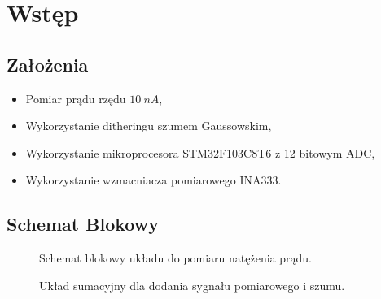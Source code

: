 \section{Wstęp}
    \subsection{Założenia}
        \begin{itemize}
            \item Pomiar prądu rzędu $10\ nA$,
            \item Wykorzystanie ditheringu szumem Gaussowskim, 
            \item Wykorzystanie mikroprocesora STM32F103C8T6 z 12 bitowym ADC,
            \item Wykorzystanie wzmacniacza pomiarowego INA333.
        \end{itemize}
    \subsection{Schemat Blokowy}
    \begin{figure}[!ht]
        \centering
        \scalebox{1}{}
        \caption{Schemat blokowy układu do pomiaru natężenia prądu.}
        \label{sch:BD}
    \end{figure}
    \begin{figure}[!ht]
        \centering
        \scalebox{1}{}
        \caption{Układ sumacyjny dla dodania sygnału pomiarowego i szumu. }
        \label{sch:sumator}
    \end{figure}